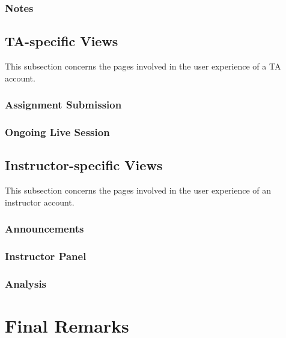 \documentclass[a4paper, 12pt]{article}
\begin{document}
    \subsubsection{Notes}
    
    
    \subsection{TA-specific Views}
    
    This subsection concerns the pages involved in the user experience of a TA account.
    
    \subsubsection{Assignment Submission}
    
    \subsubsection{Ongoing Live Session}
    
    
    \subsection{Instructor-specific Views}
    
    This subsection concerns the pages involved in the user experience of an instructor account.
    
    \subsubsection{Announcements}
    
    \subsubsection{Instructor Panel}
    
    \subsubsection{Analysis}
    
    
    \section{Final Remarks}
    
    
    
    \pagebreak
    \printbibliography
    
    
\end{document}
